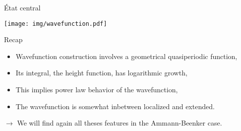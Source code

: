 \documentclass[xcolor=x11names,compress,professionalfonts]{beamer}
\renewcommand{\(}{\begin{columns}}
\renewcommand{\)}{\end{columns}}
\newcommand{\<}[1]{\begin{column}{#1}}
\renewcommand{\>}{\end{column}}
\begin{document}
\begin{frame}{État central}

{\centering
\texttt{[image: img/wavefunction.pdf]}

}

\end{frame}

\begin{frame}{Recap}

\begin{itemize}
	\item Wavefunction construction involves a geometrical quasiperiodic function,
	\item Its integral, the height function, has logarithmic growth,
	\item This implies power law behavior of the wavefunction,
	\item The wavefunction is somewhat inbetween localized and extended.
\end{itemize}
$\rightarrow$ We will find again all theses features in the Ammann-Beenker case.
\end{frame}
\end{document}
